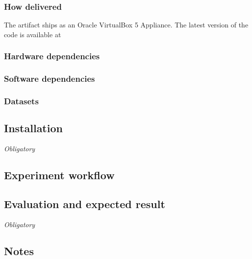 \documentclass{sigplanconf}
\begin{document}
\subsubsection{How delivered}

The artifact ships as an Oracle VirtualBox 5 Appliance. The latest version of the code is available at \url{}

\subsubsection{Hardware dependencies}

\subsubsection{Software dependencies}

\subsubsection{Datasets}

\subsection{Installation}

{\em Obligatory}

\subsection{Experiment workflow}

\subsection{Evaluation and expected result}

{\em Obligatory}

\subsection{Notes}

\end{document}
